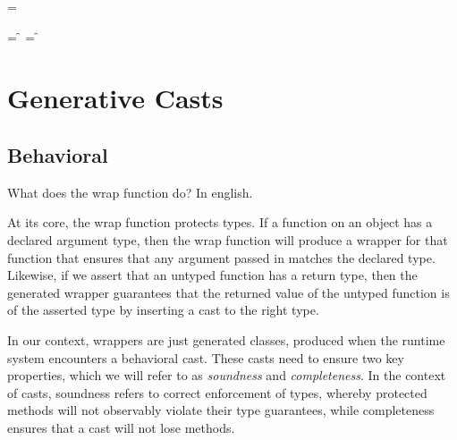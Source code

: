 \documentclass[a4paper,UKenglish,final]{lipics}
\begin{document}
\names{\Mtype\m\t\t} = \m

\names{\Mtype\f\t\t} = \f

\names{\Mtype\f{}\t} = \f

\newcommand{\getmdef}{\text{mdef}}
% 
% 
% 
% 
% 
\newcommand{\getmtype}{\text{mtype}}
% 
% 

\section{Generative Casts}

\subsection{Behavioral}



\hrulefill

\begin{mathpar}
\end{mathpar}

What does the wrap function do? In english.

At its core, the wrap function protects types. If a function on an object has a declared argument type, then the wrap function will produce a wrapper for that function that ensures that any argument passed in matches the declared type. Likewise, if we assert that an untyped function has a return type, then the generated wrapper guarantees that the returned value of the untyped function is of the asserted type by inserting a cast to the right type.

In our context, wrappers are just generated classes, produced when the runtime system encounters a behavioral cast. These casts need to ensure two key properties, which we will refer to as \emph{soundness} and \emph{completeness}. In the context of casts, soundness refers to correct enforcement of types, whereby protected methods will not observably violate their type guarantees, while completeness ensures that a cast will not lose methods.
\end{document}
